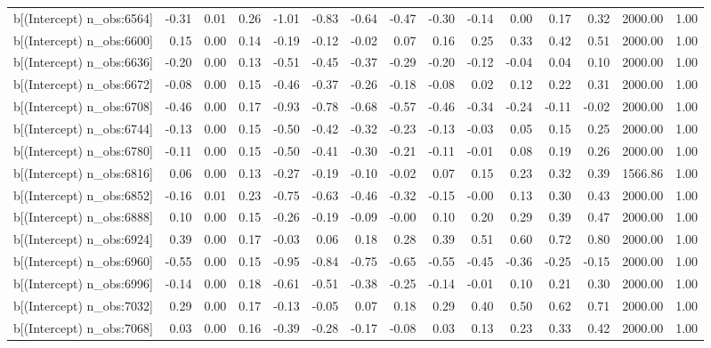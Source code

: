 \begin{table}[ht]
\begin{tabular}{rrrrrrrrrrrrrrr}
  b[(Intercept) n\_obs:6564] & -0.31 & 0.01 & 0.26 & -1.01 & -0.83 & -0.64 & -0.47 & -0.30 & -0.14 & 0.00 & 0.17 & 0.32 & 2000.00 & 1.00 \\ 
  b[(Intercept) n\_obs:6600] & 0.15 & 0.00 & 0.14 & -0.19 & -0.12 & -0.02 & 0.07 & 0.16 & 0.25 & 0.33 & 0.42 & 0.51 & 2000.00 & 1.00 \\ 
  b[(Intercept) n\_obs:6636] & -0.20 & 0.00 & 0.13 & -0.51 & -0.45 & -0.37 & -0.29 & -0.20 & -0.12 & -0.04 & 0.04 & 0.10 & 2000.00 & 1.00 \\ 
  b[(Intercept) n\_obs:6672] & -0.08 & 0.00 & 0.15 & -0.46 & -0.37 & -0.26 & -0.18 & -0.08 & 0.02 & 0.12 & 0.22 & 0.31 & 2000.00 & 1.00 \\ 
  b[(Intercept) n\_obs:6708] & -0.46 & 0.00 & 0.17 & -0.93 & -0.78 & -0.68 & -0.57 & -0.46 & -0.34 & -0.24 & -0.11 & -0.02 & 2000.00 & 1.00 \\ 
  b[(Intercept) n\_obs:6744] & -0.13 & 0.00 & 0.15 & -0.50 & -0.42 & -0.32 & -0.23 & -0.13 & -0.03 & 0.05 & 0.15 & 0.25 & 2000.00 & 1.00 \\ 
  b[(Intercept) n\_obs:6780] & -0.11 & 0.00 & 0.15 & -0.50 & -0.41 & -0.30 & -0.21 & -0.11 & -0.01 & 0.08 & 0.19 & 0.26 & 2000.00 & 1.00 \\ 
  b[(Intercept) n\_obs:6816] & 0.06 & 0.00 & 0.13 & -0.27 & -0.19 & -0.10 & -0.02 & 0.07 & 0.15 & 0.23 & 0.32 & 0.39 & 1566.86 & 1.00 \\ 
  b[(Intercept) n\_obs:6852] & -0.16 & 0.01 & 0.23 & -0.75 & -0.63 & -0.46 & -0.32 & -0.15 & -0.00 & 0.13 & 0.30 & 0.43 & 2000.00 & 1.00 \\ 
  b[(Intercept) n\_obs:6888] & 0.10 & 0.00 & 0.15 & -0.26 & -0.19 & -0.09 & -0.00 & 0.10 & 0.20 & 0.29 & 0.39 & 0.47 & 2000.00 & 1.00 \\ 
  b[(Intercept) n\_obs:6924] & 0.39 & 0.00 & 0.17 & -0.03 & 0.06 & 0.18 & 0.28 & 0.39 & 0.51 & 0.60 & 0.72 & 0.80 & 2000.00 & 1.00 \\ 
  b[(Intercept) n\_obs:6960] & -0.55 & 0.00 & 0.15 & -0.95 & -0.84 & -0.75 & -0.65 & -0.55 & -0.45 & -0.36 & -0.25 & -0.15 & 2000.00 & 1.00 \\ 
  b[(Intercept) n\_obs:6996] & -0.14 & 0.00 & 0.18 & -0.61 & -0.51 & -0.38 & -0.25 & -0.14 & -0.01 & 0.10 & 0.21 & 0.30 & 2000.00 & 1.00 \\ 
  b[(Intercept) n\_obs:7032] & 0.29 & 0.00 & 0.17 & -0.13 & -0.05 & 0.07 & 0.18 & 0.29 & 0.40 & 0.50 & 0.62 & 0.71 & 2000.00 & 1.00 \\ 
  b[(Intercept) n\_obs:7068] & 0.03 & 0.00 & 0.16 & -0.39 & -0.28 & -0.17 & -0.08 & 0.03 & 0.13 & 0.23 & 0.33 & 0.42 & 2000.00 & 1.00 \\ 

\end{tabular}
\end{table}

